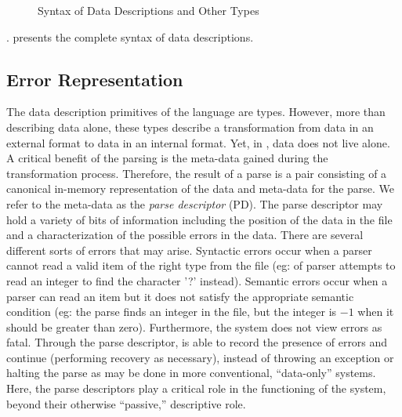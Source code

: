 \begin{figure}
  \centering
  
  \caption{Syntax of Data Descriptions and Other Types}
  \label{fig:syntax-dd}
\end{figure}

. 
presents the complete syntax of \datatype{} data descriptions.

\subsection{Error Representation}

The data description primitives of the \pads{} language are types.
However, more than describing data alone, these types describe a
transformation from data in an external format to data in an internal
format.  Yet, in \pads{}, data does not live alone. A critical benefit
of the parsing is the meta-data gained during the transformation
process.  Therefore, the result of a parse is a pair consisting of a
canonical in-memory representation of the data and meta-data for the
parse.  We refer to the meta-data as the {\em parse descriptor} (PD).
The parse descriptor may hold a variety of bits of information
including the position of the data in the file and a characterization
of the possible errors in the data.  There are several different sorts
of errors that may arise.  Syntactic errors occur when a parser cannot
read a valid item of the right type from the file (eg: of parser
attempts to read an integer to find the character '?'  instead).
Semantic errors occur when a parser can read an item but it does not
satisfy the appropriate semantic condition (eg: the parse finds an
integer in the file, but the integer is $-1$ when it should be greater
than zero).  Furthermore, the \pads{} system does not view errors as
fatal. Through the parse descriptor, \pads{} is able to record the
presence of errors and continue (performing recovery as necessary),
instead of throwing an exception or halting the parse as may be done
in more conventional, ``data-only'' systems. Here, the parse
descriptors play a critical role in the functioning of the system,
beyond their otherwise ``passive,'' descriptive role.
